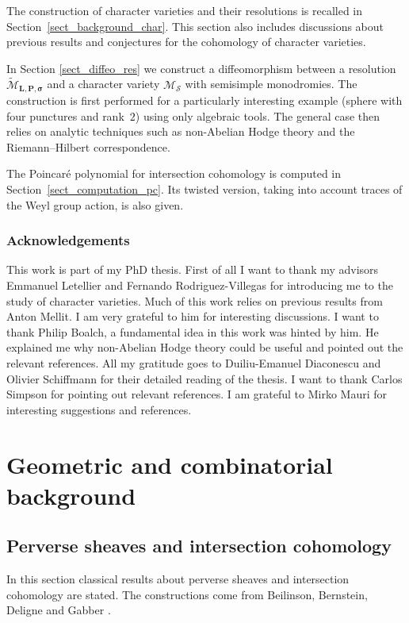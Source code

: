 \documentclass[JEP,XML,SOM,NoEqCountersInSection,Unicode,published]{cedram}
\theoremstyle{definition}
\theoremstyle{plain}
\newcommand{\mlps}{\widetilde{\mathcal{M}}_{\boldsymbol{L},\boldsymbol{P},\boldsymbol{\sigma}}}
\begin{document}
The construction of character varieties and their resolutions is recalled in Section~\ref{sect_background_char}. This section also includes discussions about previous results and conjectures for the cohomology of character varieties.

In Section \ref{sect_diffeo_res} we construct a diffeomorphism between a resolution $\mlps$ and a character variety $\mathcal{M}_{\boldsymbol{\mathcal{S}}}$ with semisimple monodromies. The construction is first performed for a particularly interesting example (sphere with four punctures and rank~$2$) using only algebraic tools. The general case then relies on analytic techniques such as non-Abelian Hodge theory and the Riemann--Hilbert correspondence.

The Poincaré polynomial for intersection cohomology is computed in Section~\ref{sect_computation_pc}. Its twisted version, taking into account traces of the Weyl group action, is also given.

\subsubsection*{Acknowledgements}

This work is part of my PhD thesis. First of all I want to thank my advisors Emmanuel Letellier and Fernando Rodriguez-Villegas for introducing me to the study of character varieties. Much of this work relies on previous results from Anton Mellit. I am very grateful to him for interesting discussions. I want to thank Philip Boalch, a fundamental idea in this work was hinted by him. He explained me why non-Abelian Hodge theory could be useful and pointed out the relevant references. All my gratitude goes to Duiliu-Emanuel Diaconescu and Olivier Schiffmann for their detailed reading of the thesis. I want to thank Carlos Simpson for pointing out relevant references. I am grateful to Mirko Mauri for interesting suggestions and references.

\section{Geometric and combinatorial background}\label{sect_background}
\subsection{Perverse sheaves and intersection cohomology}\label{sect_perv_ic}
In this section classical results about perverse sheaves and intersection cohomology are stated. The constructions come from Beilinson, Bernstein, Deligne and Gabber \cite{Beilinson_Bernstein_Deligne_Gabber}.
\end{document}

